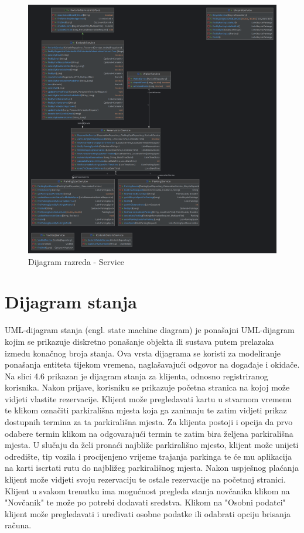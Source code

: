 \begin{figure}[H]
	\includegraphics[width=\textwidth]{slike/services.png} %
	\centering
	\caption{Dijagram razreda - Service}
	\label{fig:dijagramrazreda2}
\end{figure}






\eject

\section{Dijagram stanja}

UML-dijagram stanja (engl. state machine diagram) je ponašajni UML-dijagram kojim se prikazuje
diskretno ponašanje objekta ili sustava putem prelazaka izmedu konačnog broja stanja.
Ova vrsta dijagrama se koristi za modeliranje ponašanja entiteta tijekom vremena, naglašavajući
odgovor na događaje i okidače. Na slici 4.6 prikazan je dijagram stanja za klijenta, odnosno registriranog korisnika. Nakon prijave, korisniku se prikazuje početna stranica na kojoj može vidjeti vlastite rezervacije. Klijent može pregledavati kartu u stvarnom vremenu te klikom označiti parkirališna mjesta koja ga zanimaju te zatim vidjeti prikaz dostupnih termina za ta parkirališna mjesta. Za klijenta postoji i opcija da prvo odabere termin klikom na odgovarajući termin te zatim bira željena parkirališna mjesta. U slučaju da želi pronaći najbliže parkirališno mjesto, klijent može unijeti odredište, tip vozila i procijenjeno vrijeme trajanja parkinga te će mu aplikacija na karti iscrtati rutu do najbližeg parkirališnog mjesta. Nakon uspješnog plaćanja klijent može vidjeti svoju rezervaciju te ostale rezervacije na početnoj stranici. Klijent u svakom trenutku ima mogućnost pregleda stanja novčanika klikom na "Novčanik" te može po potrebi dodavati sredstva. Klikom na "Osobni podatci" klijent može pregledavati i uređivati osobne podatke ili odabrati opciju brisanja računa.

